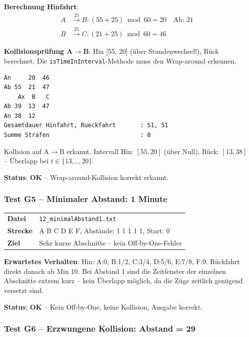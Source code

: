 \documentclass[12pt,a4paper]{article}
\newcommand{\pass}{\textcolor{passgreen}{\textbf{OK}}}
\begin{document}
\textbf{Berechnung Hinfahrt}:
\begin{align*}
    A &\xrightarrow{25} B: (55+25)\bmod60 = 20 \quad \text{Ab: 21} \\
    B &\xrightarrow{25} C: (21+25)\bmod60 = 46
\end{align*}

\textbf{Kollisionsprüfung A$\to$B}: Hin [55, 20] (über Stundenwechsel!), Rück berechnet. Die \texttt{isTimeInInterval}-Methode muss den Wrap-around erkennen.

\begin{lstlisting}[caption={Ausgabe G4 -- Einfache Fahrt}]
An     20  46
Ab 55  21  47
    Ax  B   C
Ab 39  13  47
An 38  12
Gesamtdauer Hinfahrt, Rueckfahrt       : 51, 51
Summe Strafen                          : 0
\end{lstlisting}

Kollision auf A$\to$B erkannt. Intervall Hin: $[55, 20]$ (über Null), Rück: $[13, 38]$ -- Überlapp bei $t \in \{13,..,20\}$.

\textbf{Status}: \pass{} -- Wrap-around-Kollision korrekt erkannt.

\subsubsection{Test G5 -- Minimaler Abstand: 1 Minute}

\begin{center}
\begin{tabular}{ll}
\toprule
\textbf{Datei} & \texttt{12\_minimalAbstand1.txt} \\
\textbf{Strecke} & A B C D E F, Abstände: 1 1 1 1 1, Start: 0 \\
\textbf{Ziel} & Sehr kurze Abschnitte -- kein Off-by-One-Fehler \\
\bottomrule
\end{tabular}
\end{center}

\textbf{Erwartetes Verhalten}: Hin: A:0, B:1/2, C:3/4, D:5/6, E:7/8, F:9. Rückfahrt direkt danach ab Min 10. Bei Abstand 1 sind die Zeitfenster der einzelnen Abschnitte extrem kurz -- kein Überlapp möglich, da die Züge zeitlich genügend versetzt sind.

\textbf{Status}: \pass{} -- Kein Off-by-One, keine Kollision, Ausgabe korrekt.

\subsubsection{Test G6 -- Erzwungene Kollision: Abstand = 29}
\end{document}
